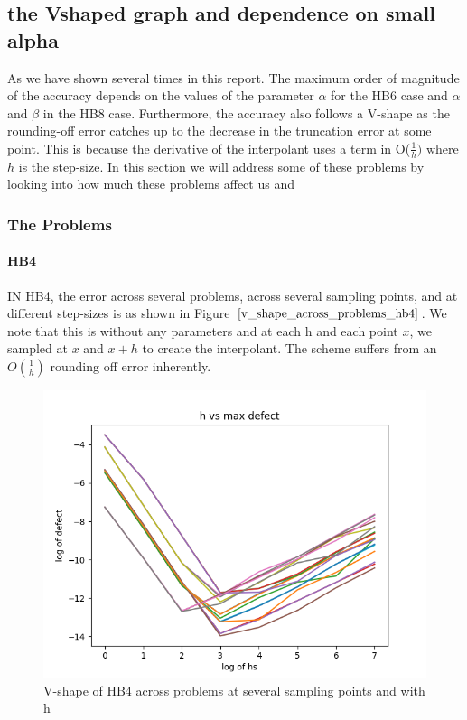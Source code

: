 \documentclass{article}
\begin{document}
\subsection{the Vshaped graph and dependence on small alpha}
\label{section:v_shaped_graph}
As we have shown several times in this report. The maximum order of magnitude of the accuracy depends on the values of the parameter $\alpha$ for the HB6 case and $\alpha$ and $\beta$ in the HB8 case. Furthermore, the accuracy also follows a V-shape as the rounding-off error catches up to the decrease in the truncation error at some point. This is because the derivative of the interpolant uses a term in O($\frac{1}{h})$ where $h$ is the step-size. In this section we will address some of these problems by looking into how much these problems affect us and 

\subsubsection{The Problems}
\paragraph{HB4}
IN HB4, the error across several problems, across several sampling points, and at different step-sizes is as shown in Figure $\ref{v_shape_across_problems_hb4}$. We note that this is without any parameters and at each h and each point $x$, we sampled at $x$ and $x + h$ to create the interpolant. The scheme suffers from an $O(\frac{1}{h})$ rounding off error inherently.
\begin{figure}[H]
\centering
\includegraphics[width=0.7\linewidth]{./figures/v_shape_across_problems_hb4}
\caption{V-shape of HB4 across problems at several sampling points and with h}
\label{fig:v_shape_across_problems_hb4}
\end{figure}
\end{document}
